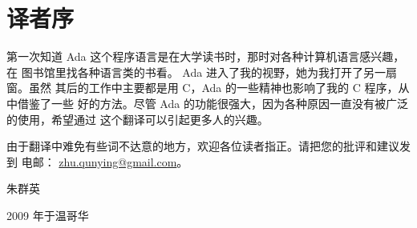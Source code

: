 %
%
%

\chapter{译者序}
\pagestyle{empty}

第一次知道 Ada 这个程序语言是在大学读书时，那时对各种计算机语言感兴趣，在
图书馆里找各种语言类的书看。 Ada 进入了我的视野，她为我打开了另一扇窗。虽然
其后的工作中主要都是用 C，Ada 的一些精神也影响了我的 C 程序，从中借鉴了一些
好的方法。尽管 Ada 的功能很强大，因为各种原因一直没有被广泛的使用，希望通过
这个翻译可以引起更多人的兴趣。

 
由于翻译中难免有些词不达意的地方，欢迎各位读者指正。请把您的批评和建议发到
电邮： \url{zhu.qunying@gmail.com}。


\vspace{5em}
\begin{flushright}
朱群英

2009 年于温哥华
\end{flushright}


